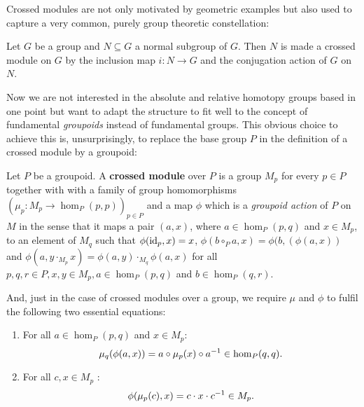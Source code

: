 Crossed modules are not only motivated by geometric examples but also used to
capture a very common, purely group theoretic constellation:

\begin{example}
Let $G$ be a group and $N \subseteq G$ a normal subgroup of $G$. Then $N$ is made a
crossed module on $G$ by the inclusion map $i : N \to G$ and the conjugation action
of $G$ on $N$.
\end{example}

Now we are not interested in the absolute and relative homotopy groups based in
one point but want to adapt the structure to fit well to the concept of fundamental
\emph{groupoids} instead of fundamental groups.
This obvious choice to achieve this is, unsurprisingly, to replace the base group $P$ in
the definition of a crossed module by a groupoid:

\begin{defn} \label{def:xmod-gpd}
Let $P$ be a groupoid.
A \textbf{crossed module} over $P$ is a group $M_p$
for every $p \in P$ together with
with a family of group homomorphisms $(\mu_p : M_p \to \hom_P(p,p))_{p \in P}$
and a map $\phi$ which is a \emph{groupoid action} of $P$ on $M$ in the sense that
it maps a pair $(a,x)$, where $a \in \hom_P(p,q)$ and $x \in M_p$, to an element
of $M_q$ such that $\phi(\operatorname{id}_p,x) = x$, $\phi(b \circ_P a, x) = \phi(b,(\phi(a,x))$
and $\phi(a, y \cdot_{M_p} x) = \phi(a,y) \cdot_{M_q} \phi(a,x)$ for all
$p, q, r \in P, x,y \in M_p, a \in \hom_P(p,q)$ and $b \in \hom_P(q,r)$.

And, just in the case of crossed modules over a group, we require $\mu$ and $\phi$
to fulfil the following two essential equations:
\begin{enumerate}
\item For all $a \in \hom_P(p,q)$ and $x \in M_p$:
\begin{equation} \label{eq:gp-CM1}
\mu_q(\phi(a,x)) = a \circ \mu_p(x) \circ a^{-1} \in \hom_P(q,q) \text{.}
\end{equation}
\item For all $c, x \in M_p$ :
\begin{equation} \label{eq:gp-CM2}
\phi(\mu_p(c),x) = c \cdot x \cdot c^{-1} \in M_p \text{.}
\end{equation}
\end{enumerate}
\end{defn}

